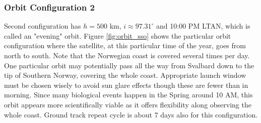 \subsubsection{Orbit Configuration 2} \label{sec:orbit2}
Second configuration has $h=500$ km, $i\approx 97.31^{\circ}$ and 10:00 PM LTAN, which is called an "evening" orbit. Figure \ref{fig:orbit_sso} shows the particular orbit configuration where the satellite, at this particular time of the year, goes from north to south. Note that the Norwegian coast is covered several times per day. One particular orbit may potentially pass all the way from Svalbard down to the tip of Southern Norway, covering the whole coast. Appropriate launch window must be chosen wisely to avoid sun glare effects though these are fewer than in morning. Since many biological events happen in the Spring around 10 AM, this orbit appears more scientifically viable as it offers flexibility along observing the whole coast. Ground track repeat cycle is about 7 days also for this configuration.

